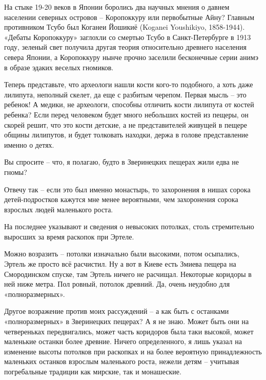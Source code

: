 На стыке 19-20 веков в Японии боролись два научных мнения о давнем населении северных островов – Коропоккуру или первобытные Айну? Главным противником Тсубо был Коганеи Йошикиё (Koganei Youshikiyo, 1858-1944). «Дебаты Коропоккуру» заглохли со смертью Тсубо в Санкт-Петербурге в 1913 году, зеленый свет получила другая теория относительно древнего населения севера Японии, а Коропоккуру нынче прочно заселили бесконечные серии анимэ в образе эдаких веселых гномиков.


Теперь представьте, что археологи нашли кости кого-то подобного, а хоть даже лилипута, неполный скелет, да еще с разбитым черепом. Первая мысль – это ребенок! А медики, не археологи, способны отличить кости лилипута от костей ребенка? Если перед человеком будет много небольших костей из пещеры, он скорей решит, что это кости детские, а не представителей живущей в пещере общины лилипутов, и будет толковать находки, держа в голове представление именно о детях.

Вы спросите – что, я полагаю, будто в Зверинецких пещерах жили едва не гномы?

Отвечу так – если это был именно монастырь, то захоронения в нишах сорока детей-подростков кажутся мне менее вероятными, чем захоронения сорока взрослых людей маленького роста.

На последнее указывают и сведения о невысоких потолках, столь стремительно выросших за время раскопок при Эртеле.

Можно возразить – потолки изначально были высокими, потом осыпались, Эртель же просто всё расчистил. Ну а вот в Киеве есть Змиева пещера на Смородинском спуске, там Эртель ничего не расчищал. Некоторые коридоры в ней ниже метра. Пол ровный, потолок древний. Да, очень неудобно для «полноразмерных».

Другое возражение против моих рассуждений – а как быть с останками «полноразмерных» в Зверинецких пещерах? А я не знаю. Может быть они на четвереньках передвигались, может  часть коридоров была таки высокой, может маленькие останки более древние. Ничего определенного, я лишь указал на изменение высоты потолков при раскопках и на более вероятную принадлежность маленьких останков взрослым маленького роста, нежели детям – учитывая погребальные традиции как мирские, так и монашеские.

